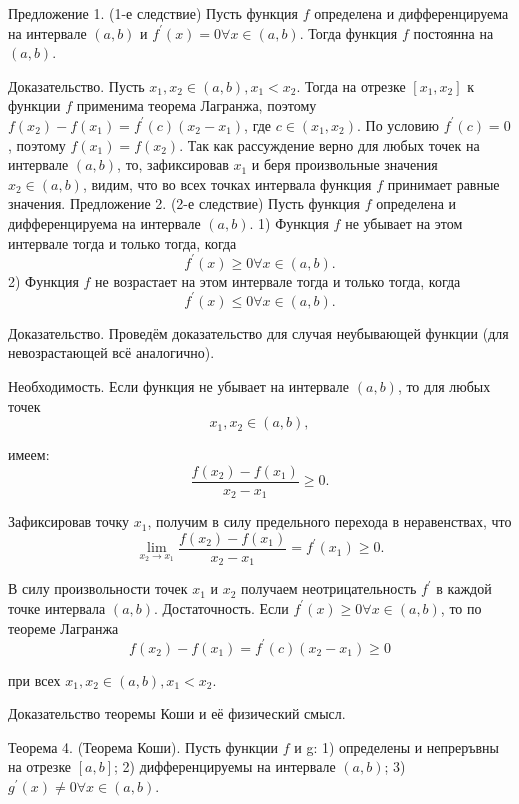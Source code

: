 Предложение 1. (1-е следствие) Пусть функция $f$ определена и дифференцируема на интервале $(a, b)$ и $f^{\prime}(x)=0 \forall x \in(a, b)$. Тогда функция $f$ постоянна на $(a, b)$.

Доказательство. Пусть $x_1, x_2 \in(a, b), x_1<x_2$. Тогда на отрезке $\left[x_1, x_2\right]$ к функции $f$ применима теорема Лагранжа, поэтому $f\left(x_2\right)-f\left(x_1\right)=f^{\prime}(c)\left(x_2-x_1\right)$, где $c \in\left(x_1, x_2\right)$. По условию $f^{\prime}(c)=0$, поэтому $f\left(x_1\right)=f\left(x_2\right)$. Так как рассуждение верно для любых точек на интервале $(a, b)$, то, зафиксировав $x_1$ и беря произвольные значения $x_2 \in(a, b)$, видим, что во всех точках интервала функция $f$ принимает равные значения.
Предложение 2. (2-е следствие) Пусть функция $f$ определена и дифференцируема на интервале $(a, b)$.
1) Функция $f$ не убывает на этом интервале тогда и только тогда, когда
$$
f^{\prime}(x) \geq 0 \forall x \in(a, b) .
$$
2) Функция $f$ не возрастает на этом интервале тогда и только тогда, когда
$$
f^{\prime}(x) \leq 0 \forall x \in(a, b) .
$$

Доказательство. Проведём доказательство для случая неубывающей функции (для невозрастающей всё аналогично).

Необходимость. Если функция не убывает на интервале $(a, b)$, то для любых точек
$$
x_1, x_2 \in(a, b),
$$

имеем:
$$
\frac{f\left(x_2\right)-f\left(x_1\right)}{x_2-x_1} \geq 0 .
$$

Зафиксировав точку $x_1$, получим в силу предельного перехода в неравенствах, что
$$
\lim _{x_2 \rightarrow x_1} \frac{f\left(x_2\right)-f\left(x_1\right)}{x_2-x_1}=f^{\prime}\left(x_1\right) \geq 0 .
$$

В силу произвольности точек $x_1$ и $x_2$ получаем неотрицательность $f^{\prime}$ в каждой точке интервала $(a, b)$.
Достаточность. Если $f^{\prime}(x) \geq 0 \forall x \in(a, b)$, то по теореме Лагранжа
$$
f\left(x_2\right)-f\left(x_1\right)=f^{\prime}(c)\left(x_2-x_1\right) \geq 0
$$

при всех $x_1, x_2 \in(a, b), x_1<x_2$.
\newpage

\begin{problem}
Доказательство теоремы Коши и её физический смысл.
\end{problem}
Теорема 4. (Теорема Коши). Пусть функции $f$ и g:
1) определены и непреръвны на отрезке $[a, b]$;
2) дифференцируемы на интервале $(a, b)$;
3) $g^{\prime}(x) \neq 0 \forall x \in(a, b)$.

